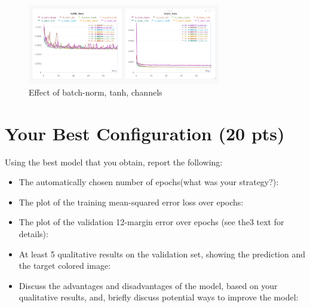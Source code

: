\documentclass[12pt]{article}
\begin{document}
    \begin{figure}[!htb]
        \centering
        \includegraphics[width=0.75\textwidth]{figures/part-2.png}
        \caption{Effect of batch-norm, tanh, channels}
        \label{fig:part-2}
    \end{figure}

\section{Your Best Configuration (20 pts)}
Using the best model that you obtain, report the following:
 
    \begin{itemize}
        \item The automatically chosen number of epochs(what was your strategy?):
        \item The plot of the training mean-squared error loss over epochs:
        \item The  plot  of  the  validation  12-margin  error  over  epochs (see the3 text for details):
        \item At least 5 qualitative results on the validation set, showing the prediction and the target colored image:
        \item Discuss the advantages and disadvantages of the model, based on your qualitative results, and, briefly discuss potential ways to improve the model:
    \end{itemize}
\end{document}
